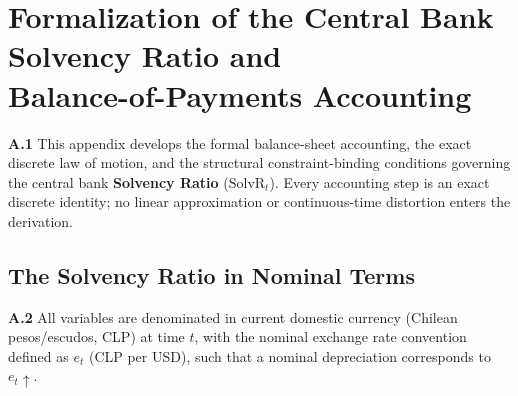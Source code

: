 
\section[Formalization of Solvency Ratio and Balance-of-Payments Accounting]{Formalization of the Central Bank Solvency Ratio and\\Balance-of-Payments Accounting}
\label{app:bop_levr}

\textbf{A.1} This appendix develops the formal balance-sheet accounting, the exact discrete law of motion, and the structural constraint-binding conditions governing the central bank \textbf{Solvency Ratio} ($\text{SolvR}_t$). Every accounting step is an exact discrete identity; no linear approximation or continuous-time distortion enters the derivation.

\subsection{The Solvency Ratio in Nominal Terms}
\label{app:solvr_nominal}

\textbf{A.2} All variables are denominated in current domestic currency (Chilean pesos/escudos, CLP) at time $t$, with the nominal exchange rate convention defined as $e_t$ (CLP per USD), such that a nominal depreciation corresponds to $e_t \uparrow$.

